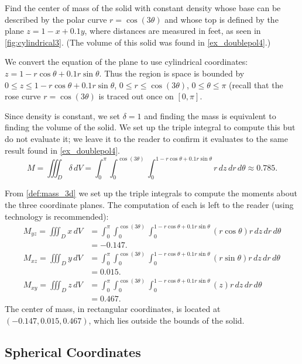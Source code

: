 {Find the center of mass of the solid with constant density whose base can be described by the polar curve $r=\cos(3\theta)$ and whose top is defined by the plane $z=1-x+0.1y$, where distances are measured in feet, as seen in \autoref{fig:cylindrical3}. (The volume of this solid was found in \autoref{ex_doublepol4}.)}
{We convert the equation of the plane to use cylindrical coordinates: $z= 1-r\cos\theta+0.1r\sin\theta$. Thus the region is space is bounded by $0 \leq z \leq 1-r\cos\theta + 0.1r\sin\theta$, $0 \leq r \leq \cos(3\theta)$, $0 \leq \theta \leq \pi$ (recall that the rose curve $r=\cos(3\theta)$ is traced out once on $[0,\pi]$.

Since density is constant, we set $\delta = 1$ and finding the mass is equivalent to finding the volume of the solid. We set up the triple integral to compute this but do not evaluate it; we leave it to the reader to confirm it evaluates to the same result found in \autoref{ex_doublepol4}.
\[
M = \iiint_D\delta \, dV = \int_0^{\pi}\int_0^{\cos(3\theta)}\int_0^{1-r\cos\theta+0.1r\sin\theta} r\,dz\,dr\,d\theta \approx 0.785.
\]

From \autoref{def:mass_3d} we set up the triple integrals to compute the moments about the three coordinate planes. The computation of each is left to the reader (using technology is recommended):
\begin{align*}
M_{yz} = \iiint_D x\,dV &= \int_0^{\pi}\int_0^{\cos(3\theta)}\int_0^{1-r\cos\theta+0.1r\sin\theta} (r\cos\theta) r\,dz\,dr\,d\theta\\
&= -0.147.
\\
M_{xz} = \iiint_D y\,dV &= \int_0^{\pi}\int_0^{\cos(3\theta)}\int_0^{1-r\cos\theta+0.1r\sin\theta} (r\sin\theta) r\,dz\,dr\,d\theta\\
&= 0.015.\\
M_{xy} = \iiint_D z\,dV &= \int_0^{\pi}\int_0^{\cos(3\theta)}\int_0^{1-r\cos\theta+0.1r\sin\theta} (z) r\,dz\,dr\,d\theta\\
 &= 0.467.
\end{align*}
The center of mass, in rectangular coordinates,  is located at $(-0.147,0.015,0.467)$, which lies outside the bounds of the solid.}

\subsection{Spherical Coordinates}

